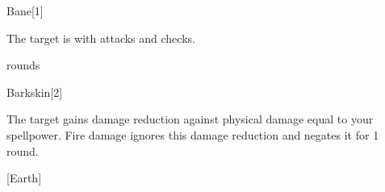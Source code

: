 \begin{spellsection}{Bane}[1]
    \begin{spellheader}
    \end{spellheader}
    \begin{spellcontent}
        \begin{spelltargetinginfo}
        \end{spelltargetinginfo}
        \begin{spelleffects}
            \spelleffect The target is \impaired with attacks and checks.

             rounds
        \end{spelleffects}
    \end{spellcontent}
    \begin{spellfooter}
        \miscastrandom
    \end{spellfooter}
    \begin{spellaugments}
    \end{spellaugments}
\end{spellsection}

\begin{spellsection}{Barkskin}[2]
    \begin{spellheader}
    \end{spellheader}
    \begin{spellcontent}
        \begin{spelltargetinginfo}
        \end{spelltargetinginfo}
        \begin{spelleffects}
            \spelleffect The target gains damage reduction against physical damage equal to your spellpower.
            Fire damage ignores this damage reduction and negates it for 1 round.
            \spelldur \durshort
        \end{spelleffects}
    \end{spellcontent}
    \begin{spellfooter}
        \miscastexplode
    \end{spellfooter}
    \begin{spellaugments}
        [Earth]
    \end{spellaugments}
\end{spellsection}

